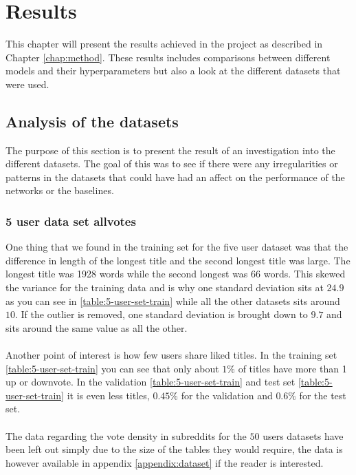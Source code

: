 \chapter{Results}\label{chap:results}
This chapter will present the results achieved in the project as described in Chapter \ref{chap:method}. These results includes comparisons between different models and their hyperparameters but also a look at the different datasets that were used.

\section{Analysis of the datasets}
\label{sec:dataset-summary}
The purpose of this section is to present the result of an investigation into the different datasets. The goal of this was to see if there were any irregularities or patterns in the datasets that could have had an affect on the performance of the networks or the baselines. 
\subsection{5 user data set allvotes}
\label{sec:five-user-data-set}

One thing that we found in the training set for the five user dataset was that the difference in length of the longest title and the second longest title was large. The longest title was 1928 words while the second longest was 66 words. This skewed the variance for the training data and is why one standard deviation sits at $24.9$ as you can see in \ref{table:5-user-set-train} while all the other datasets sits around $10$. If the outlier is removed, one standard deviation is brought down to $9.7$ and sits around the same value as all the other.
\\\\
Another point of interest is how few users share liked titles. In the training set \ref{table:5-user-set-train} you can see that only about $1\%$ of titles have more than 1 up or downvote. In the validation \ref{table:5-user-set-train} and test set \ref{table:5-user-set-train} it is even less titles, $0.45\%$ for the validation and $0.6\%$ for the test set.
\\\\
The data regarding the vote density in subreddits for the $50$ users datasets have been left out simply due to the size of the tables they would require, the data is however available in appendix \ref{appendix:dataset} if the reader is interested.


